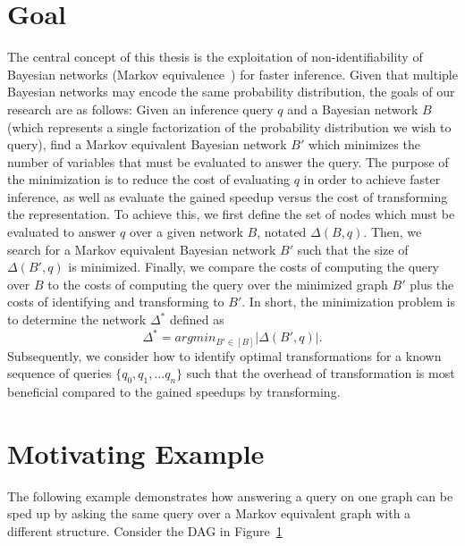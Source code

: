 \section{Goal}
\null \quad \quad The central concept of this thesis is the exploitation of non-identifiability of Bayesian networks (Markov equivalence~\cite{verma}) for faster inference. Given that multiple Bayesian networks may encode the same probability distribution, the goals of our research are as follows: \newline
\null \quad \quad Given an inference query $q$ and a Bayesian network $B$ (which represents a single factorization of the probability distribution we wish to query), find a Markov equivalent Bayesian network $B'$ which minimizes the number of variables that must be evaluated to answer the query. The purpose of the minimization is to reduce the cost of evaluating $q$ in order to achieve faster inference, as well as evaluate the gained speedup versus the cost of transforming the representation. \newline
\null \quad \quad To achieve this, we first define the set of nodes which must be evaluated to answer $q$ over a given network $B$, notated $\Delta(B,q)$. Then, we search for a Markov equivalent Bayesian network $B'$ such that the size of $\Delta(B',q)$ is minimized. Finally, we compare the costs of computing the query over $B$ to the costs of computing the query over the minimized graph $B'$ plus the costs of identifying and transforming to $B'$. In short, the minimization problem is to determine the network $\Delta^{*}$ defined as
	$$\Delta^{*} = argmin_{B' \in [B]}|\Delta(B',q)|.$$
\null \quad \quad Subsequently, we consider how to identify optimal transformations for a known sequence of queries $\{q_{0}, q_{1}, ... q_{n}\}$ such that the overhead of transformation is most beneficial compared to the gained speedups by transforming.

\newpage
\section{Motivating Example}
\null \quad \quad The following example demonstrates how answering a query on one graph can be sped up by asking the same query over a Markov equivalent graph with a different structure. Consider the DAG in Figure~\ref{fig:motivatingdag}

\begin{figure}[h!]
\begin{center}
\end{center}
\caption{}
\label{fig:motivatingdag}
\end{figure}

